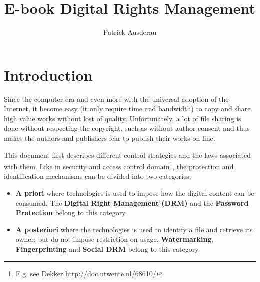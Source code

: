 \documentclass[11pt,a4paper,oneside]{memoir}
\author{Patrick Ausderau}
\title{E-book Digital Rights Management}
\begin{document}
\pagestyle{myheadings}
\markright{}



\pagestyle{empty} %
\tableofcontents*
\pagestyle{empty} %
\clearpage
\pagestyle{plain}




\setcounter{page}{1} %

\chapter{Introduction}

Since the computer era and even more with the universal adoption of the Internet, it become easy (it only require time and bandwidth) to copy and share high value works without lost of quality. Unfortunately, a lot of file sharing is done without respecting the copyright, such as without author consent and thus makes the authors and publishers fear to publish their works on-line.

This document first describes different control strategies and the laws associated with them. Like in security and access control domain\footnote{E.g. see Dekker \url{http://doc.utwente.nl/68610/}}, the protection and identification mechanisms can be divided into two categories: 
\vspace{-17pt}\begin{itemize}
	\item \textbf{A priori} where technologies is used to impose how the digital content can be consumed. The \textbf{Digital Right Management (DRM)} and the \textbf{Password Protection} belong to this category. 
	\item \textbf{A posteriori} where the technologies is used to identify a file and retrieve its owner; but do not impose restriction on usage. \textbf{Watermarking}, \textbf{Fingerprinting} and \textbf{Social DRM} belong to this category.
\end{itemize} 
\end{document}
